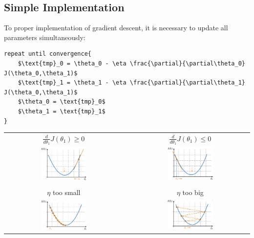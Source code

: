 \subsection{Simple Implementation}
To proper implementation of gradient descent, it is necessary to update all parameters simultaneously:
\begin{lstlisting}[mathescape=true]
repeat until convergence{
    $\text{tmp}_0 = \theta_0 - \eta \frac{\partial}{\partial\theta_0} J(\theta_0,\theta_1)$
    $\text{tmp}_1 = \theta_1 - \eta \frac{\partial}{\partial\theta_1} J(\theta_0,\theta_1)$
    $\theta_0 = \text{tmp}_0$
    $\theta_1 = \text{tmp}_1$
}
\end{lstlisting}
\begin{center}
   \begin{tabular}{c c c}
    $\frac{d}{d\theta_1} J(\theta_1) \geq 0$ & &
    $\frac{d}{d\theta_1} J(\theta_1) \leq 0$ \\
    \includegraphics[width=0.4\textwidth]{images/GradientDescent1.png} & &
    \includegraphics[width=0.4\textwidth]{images/GradientDescent2.png} \\
    \\
    $\eta$ too small & &
    $\eta$ too big \\
    \includegraphics[width=0.4\textwidth]{images/GradientDescent3.png} & &
    \includegraphics[width=0.4\textwidth]{images/GradientDescent4.png}
    \end{tabular} 
\end{center}

\newpage